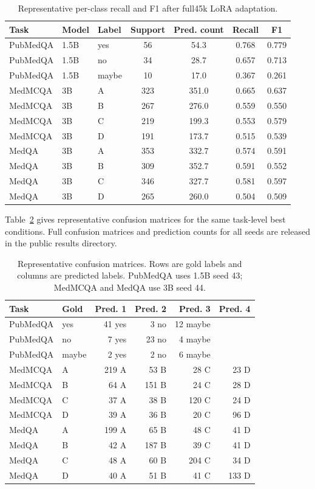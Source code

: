 \documentclass[11pt]{article}
\begin{document}
\begin{table}[h]
\centering
\scriptsize
\caption{Representative per-class recall and F1 after full45k LoRA adaptation.}
\label{tab:per_class_representative}
\begin{tabular}{lllcccc}
\toprule
Task & Model & Label & Support & Pred. count & Recall & F1 \\
\midrule
PubMedQA & 1.5B & yes & 56 & 54.3 & 0.768 & 0.779 \\
PubMedQA & 1.5B & no & 34 & 28.7 & 0.657 & 0.713 \\
PubMedQA & 1.5B & maybe & 10 & 17.0 & 0.367 & 0.261 \\
MedMCQA & 3B & A & 323 & 351.0 & 0.665 & 0.637 \\
MedMCQA & 3B & B & 267 & 276.0 & 0.559 & 0.550 \\
MedMCQA & 3B & C & 219 & 199.3 & 0.553 & 0.579 \\
MedMCQA & 3B & D & 191 & 173.7 & 0.515 & 0.539 \\
MedQA & 3B & A & 353 & 332.7 & 0.574 & 0.591 \\
MedQA & 3B & B & 309 & 352.7 & 0.591 & 0.552 \\
MedQA & 3B & C & 346 & 327.7 & 0.581 & 0.597 \\
MedQA & 3B & D & 265 & 260.0 & 0.504 & 0.509 \\
\bottomrule
\end{tabular}
\end{table}

Table~\ref{tab:confusion_representative} gives representative confusion matrices for the same task-level best conditions. Full confusion matrices and prediction counts for all seeds are released in the public results directory.

\begin{table}[h]
\centering
\scriptsize
\caption{Representative confusion matrices. Rows are gold labels and columns are predicted labels. PubMedQA uses 1.5B seed 43; MedMCQA and MedQA use 3B seed 44.}
\label{tab:confusion_representative}
\begin{tabular}{llrrrr}
\toprule
Task & Gold & Pred. 1 & Pred. 2 & Pred. 3 & Pred. 4 \\
\midrule
PubMedQA & yes & 41 yes & 3 no & 12 maybe & \\
PubMedQA & no & 7 yes & 23 no & 4 maybe & \\
PubMedQA & maybe & 2 yes & 2 no & 6 maybe & \\
MedMCQA & A & 219 A & 53 B & 28 C & 23 D \\
MedMCQA & B & 64 A & 151 B & 24 C & 28 D \\
MedMCQA & C & 37 A & 38 B & 120 C & 24 D \\
MedMCQA & D & 39 A & 36 B & 20 C & 96 D \\
MedQA & A & 199 A & 65 B & 48 C & 41 D \\
MedQA & B & 42 A & 187 B & 39 C & 41 D \\
MedQA & C & 48 A & 60 B & 204 C & 34 D \\
MedQA & D & 40 A & 51 B & 41 C & 133 D \\
\bottomrule
\end{tabular}
\end{table}
\end{document}
